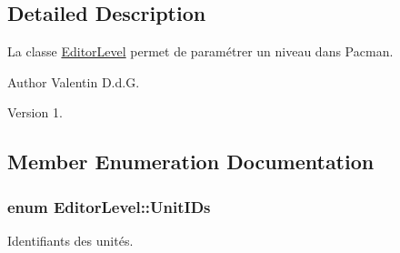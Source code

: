 \subsection{Detailed Description}
La classe \hyperlink{class_editor_level}{Editor\+Level} permet de paramétrer un niveau dans Pacman. 

\begin{DoxyAuthor}{Author}
Valentin D.\+d.\+G. 
\end{DoxyAuthor}
\begin{DoxyVersion}{Version}
1. 
\end{DoxyVersion}


\subsection{Member Enumeration Documentation}
\hypertarget{class_editor_level_adf05726a383094d778d951c075bceb59}{}
\subsubsection[{Unit\+I\+Ds}]{\setlength{\rightskip}{0pt plus 5cm}enum {\bf Editor\+Level\+::\+Unit\+I\+Ds}}\label{class_editor_level_adf05726a383094d778d951c075bceb59}


Identifiants des unités. 

